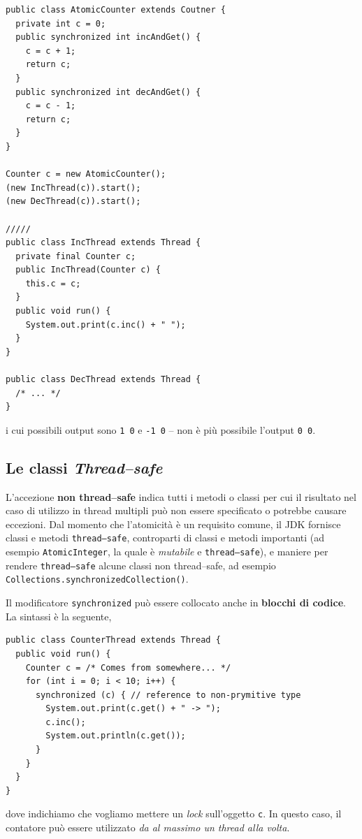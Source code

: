\documentclass[\fontsizeclass,twocolumn]{\classname}
\theoremstyle{definition}
\theoremstyle{definition}
\begin{document}
\begin{lstlisting}
public class AtomicCounter extends Coutner {
  private int c = 0;
  public synchronized int incAndGet() {
    c = c + 1;
    return c;
  }
  public synchronized int decAndGet() {
    c = c - 1;
    return c;
  }
}

Counter c = new AtomicCounter();
(new IncThread(c)).start();
(new DecThread(c)).start();

/////
public class IncThread extends Thread {
  private final Counter c;
  public IncThread(Counter c) {
    this.c = c;
  }
  public void run() {
    System.out.print(c.inc() + " ");
  }
}

public class DecThread extends Thread {
  /* ... */
}
\end{lstlisting}

i cui possibili output sono \texttt{1 0} e \texttt{-1 0} -- non è più possibile
l'output \texttt{0 0}.

\subsection{Le classi \emph{Thread--safe}}

L'accezione \textbf{non thread--safe} indica tutti i metodi o classi per cui il
risultato nel caso di utilizzo in thread multipli può non essere specificato o
potrebbe causare eccezioni. Dal momento che l'atomicità è un requisito comune,
il JDK fornisce classi e metodi \texttt{thread--safe}, controparti di classi e
metodi importanti (ad esempio \texttt{AtomicInteger}, la quale è
\emph{mutabile} e \texttt{thread--safe}), e maniere per rendere
\texttt{thread--safe} alcune classi non thread--safe, ad esempio
\texttt{Collections.synchronizedCollection()}.

Il modificatore \texttt{synchronized} può essere collocato anche in
\textbf{blocchi di codice}. La sintassi è la seguente,


\begin{lstlisting}
public class CounterThread extends Thread {
  public void run() {
    Counter c = /* Comes from somewhere... */
    for (int i = 0; i < 10; i++) {
      synchronized (c) { // reference to non-prymitive type
        System.out.print(c.get() + " -> ");
        c.inc();
        System.out.println(c.get());
      }
    }
  }
}
\end{lstlisting}

dove indichiamo che vogliamo mettere un \emph{lock} sull'oggetto \texttt{c}. In
questo caso, il contatore può essere utilizzato \emph{da al massimo un thread
alla volta}.
\end{document}
